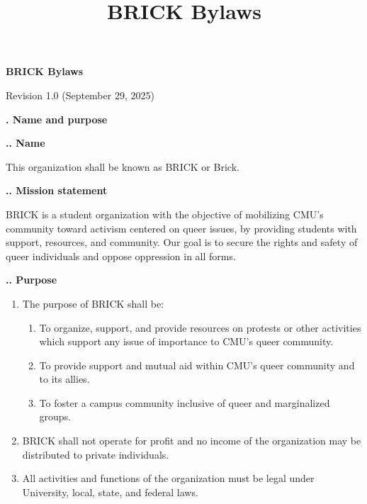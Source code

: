 \documentclass[11pt]{article}
\title{BRICK Bylaws}
\newcounter{h1}
\newcounter{h2}[h1]
\newcounter{h3}[h2]
\begin{document}
\newcommand{\tab}[1]{\stepcounter{h1}\par\large\textbf{\arabic{h1}. #1}\normalsize\par}
\newcommand{\subtab}[1]{\stepcounter{h2}\par\textbf{\arabic{h1}.\arabic{h2}. #1}\par}
\newcommand{\subsubtab}[1]{\stepcounter{h3}\par\small\textbf{\arabic{h1}.\arabic{h2}.\arabic{h3}. #1}\normalsize\par}
\renewcommand{\labelenumi}{\arabic{enumi}.} 
\renewcommand{\labelenumii}{\arabic{enumi}.\arabic{enumii}.}
\renewcommand{\labelenumiii}{\arabic{enumi}.\arabic{enumii}.\arabic{enumiii}.}
\renewcommand{\labelenumiv}{\arabic{enumi}.\arabic{enumii}.\arabic{enumiii}.\arabic{enumiv}.}

\raggedright


\begin{center}
\Large
\textbf{BRICK Bylaws}

\normalsize
Revision 1.0 (September 29, 2025)
\end{center}


\tab{Name and purpose}

\subtab{Name}

This organization shall be known as BRICK or Brick.

\subtab{Mission statement}

BRICK is a student organization with the objective of mobilizing CMU's community toward activism centered on queer issues, by providing students with support, resources, and community. Our goal is to secure the rights and safety of queer individuals and oppose oppression in all forms.

\subtab{Purpose}

\begin{enumerate}
  \item The purpose of BRICK shall be:  
  \begin{enumerate}
    \item To organize, support, and provide resources on protests or other activities which support any issue of importance to CMU's queer community.  
    \item To provide support and mutual aid within CMU's queer community and to its allies.  
    \item To foster a campus community inclusive of queer and marginalized groups.  
  \end{enumerate}
  \item BRICK shall not operate for profit and no income of the organization may be distributed to private individuals.  
  \item All activities and functions of the organization must be legal under University, local, state, and federal laws.
\end{enumerate}
\end{document}
